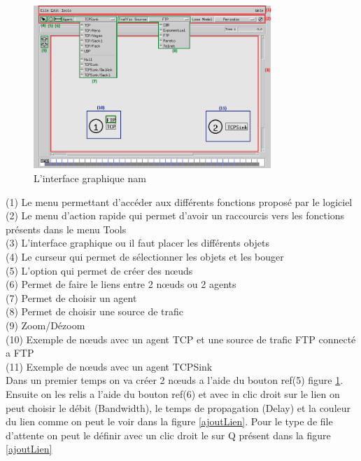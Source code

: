 \documentclass[11pt]{article}
\begin{document}
\begin{figure}[H]
	\begin{center}
		\includegraphics[width=0.8\textwidth]{assets/tp1/explicationNam.png}
	\end{center}
	\caption{L'interface graphique nam}
	\label{namExplcation}
\end{figure}

\noindent
(1) Le menu permettant d’accéder aux différents fonctions proposé par le logiciel\\
(2) Le menu d'action rapide qui permet d'avoir un raccourcis vers les fonctions présents dans le menu Tools\\
(3) L'interface graphique ou il faut placer les différents objets \\
(4) Le  curseur qui permet de sélectionner les objets et les bouger\\
(5) L'option qui permet de créer des nœuds\\
(6) Permet de faire le liens entre 2 nœuds ou 2 agents\\
(7) Permet de choisir un agent\\
(8) Permet de choisir une source de trafic \\
(9) Zoom/Dézoom\\
(10) Exemple de nœuds avec un agent TCP et une source de trafic FTP connecté a FTP\\
(11) Exemple de nœuds avec un agent TCPSink\\

Dans un premier temps on va créer 2 nœuds a l'aide du bouton ref(5) figure \ref{namExplcation}. Ensuite on les relis a l'aide du bouton ref(6) et avec in clic droit sur le lien on peut choisir le débit (Bandwidth), le temps de propagation (Delay) et la couleur du lien comme on peut le voir dans la figure \ref{ajoutLien}. Pour le type de file d'attente on peut le définir avec un clic droit le sur Q présent dans la figure \ref{ajoutLien}
\end{document}
